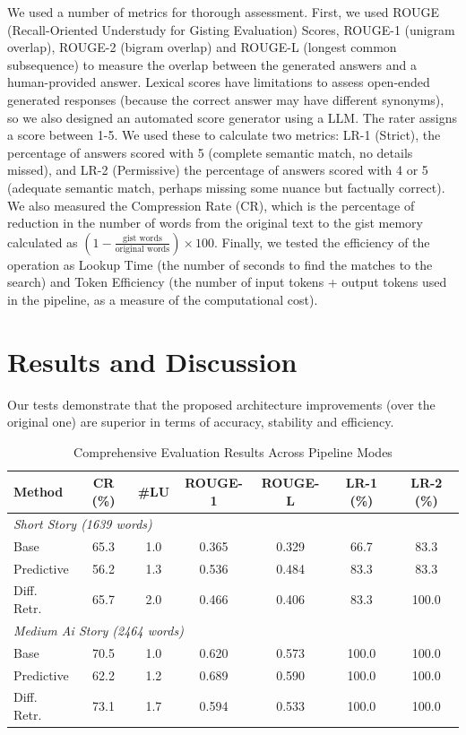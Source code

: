 \documentclass[conference]{IEEEtran}
\begin{document}
We used a number of metrics for thorough assessment. First, we used ROUGE (Recall-Oriented Understudy for Gisting Evaluation) Scores, ROUGE-1 (unigram overlap), ROUGE-2 (bigram overlap) and ROUGE-L (longest common subsequence) to measure the overlap between the generated answers and a human-provided answer. Lexical scores have limitations to assess open-ended generated responses (because the correct answer may have different synonyms), so we also designed an automated score generator using a LLM. The rater assigns a score between 1-5. We used these to calculate two metrics: LR-1 (Strict), the percentage of answers scored with 5 (complete semantic match, no details missed), and LR-2 (Permissive) the percentage of answers scored with 4 or 5 (adequate semantic match, perhaps missing some nuance but factually correct). We also measured the Compression Rate (CR), which is the percentage of reduction in the number of words from the original text to the gist memory calculated as $(1 - \frac{\text{gist words}}{\text{original words}}) \times 100$. Finally, we tested the efficiency of the operation as Lookup Time (the number of seconds to find the matches to the search) and Token Efficiency (the number of input tokens + output tokens used in the pipeline, as a measure of the computational cost).

\section{Results and Discussion}
Our tests demonstrate that the proposed architecture improvements (over the original one) are superior in terms of accuracy, stability and efficiency.  

\begin{table}[htbp]
\centering
\caption{Comprehensive Evaluation Results Across Pipeline Modes}
\label{tab:results}
\begin{tabular}{lcccccc}
\toprule
Method & CR (\%) & \#LU & ROUGE-1 & ROUGE-L & LR-1 (\%) & LR-2 (\%) \\
\midrule
\multicolumn{7}{l}{\textit{Short Story (1639 words)}} \\
  Base & 65.3 & 1.0 & 0.365 & 0.329 & 66.7 & 83.3 \\
  Predictive & 56.2 & 1.3 & 0.536 & 0.484 & 83.3 & 83.3 \\
  Diff. Retr. & 65.7 & 2.0 & 0.466 & 0.406 & 83.3 & 100.0 \\
\midrule
\multicolumn{7}{l}{\textit{Medium Ai Story (2464 words)}} \\
  Base & 70.5 & 1.0 & 0.620 & 0.573 & 100.0 & 100.0 \\
  Predictive & 62.2 & 1.2 & 0.689 & 0.590 & 100.0 & 100.0 \\
  Diff. Retr. & 73.1 & 1.7 & 0.594 & 0.533 & 100.0 & 100.0 \\
\bottomrule
\end{tabular}
\end{table}
\end{document}
